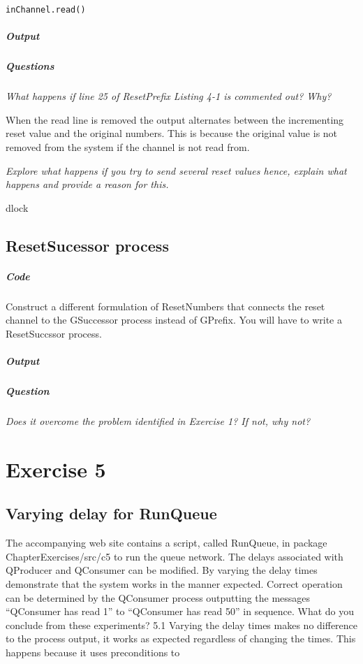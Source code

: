\documentclass[10pt, a4paper]{article}
\begin{document}
	\begin{lstlisting}[caption = "Line 25 of ResetPrefix.groovy"]
		inChannel.read()	\end{lstlisting}
		
	\subparagraph{Output}
	
	
	\subparagraph{Questions} \hfill
	
	\textit{What happens if line {25} of ResetPrefix Listing 4-1 is commented out? Why?}
	
	When the read line is removed the output alternates between the incrementing reset value and the original numbers. This is because
	the original value is not removed from the system if the channel is not read from.
		
	\textit{Explore what happens if you try to send several reset values hence, explain what happens and provide a reason for this.}
	
	dlock
	
	\subsection{ResetSucessor process}

	\subparagraph{Code}
	
		Construct a different formulation of ResetNumbers that connects the reset channel to the GSuccessor process instead of GPrefix.  You will have to write a ResetSuccssor process.  
	
	
	\subparagraph{Output}
	
	\subparagraph{Question}
	\hfill
	\textit{Does it overcome the problem identified in Exercise 1? If not, why not?}

	\setcounter{section}{5}
	\section*{Exercise 5}
	
	\setcounter{subsection}{0}
	\subsection{Varying delay for RunQueue}
	
	   The accompanying web site contains a script, called RunQueue, in package ChapterExercises/src/c5 to run the queue network.  The delays associated with QProducer and QConsumer can be modified.  By varying the delay times demonstrate that the system works in the manner expected.  Correct operation can be determined by the QConsumer process outputting the messages “QConsumer has read 1” to “QConsumer has read 50” in sequence.  What do you conclude from these experiments?
	5.1 
	Varying the delay times makes no difference to the process output, it works as expected regardless of changing the times. This happens because it uses preconditions to 
	
\end{document}
